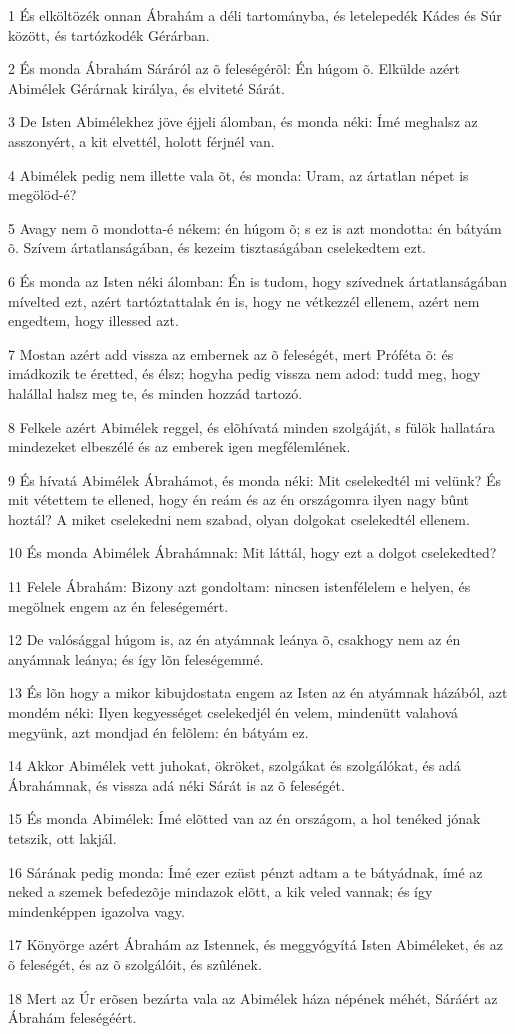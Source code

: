 \par 1 És elköltözék onnan Ábrahám a déli tartományba, és letelepedék Kádes és Súr között, és tartózkodék Gérárban.
\par 2 És monda Ábrahám Sáráról az õ feleségérõl: Én húgom õ. Elkülde azért Abimélek Gérárnak királya, és elviteté Sárát.
\par 3 De Isten Abimélekhez jöve éjjeli álomban, és monda néki: Ímé meghalsz az asszonyért, a kit elvettél, holott férjnél van.
\par 4 Abimélek pedig nem illette vala õt, és monda: Uram, az ártatlan népet is megölöd-é?
\par 5 Avagy nem õ mondotta-é nékem: én húgom õ; s ez is azt mondotta: én bátyám õ. Szívem ártatlanságában, és kezeim tisztaságában cselekedtem ezt.
\par 6 És monda az Isten néki álomban: Én is tudom, hogy szívednek ártatlanságában mívelted ezt, azért tartóztattalak én is, hogy ne vétkezzél ellenem, azért nem engedtem, hogy illessed azt.
\par 7 Mostan azért add vissza az embernek az õ feleségét, mert Próféta õ: és imádkozik te éretted, és élsz; hogyha pedig vissza nem adod: tudd meg, hogy halállal halsz meg te, és minden hozzád tartozó.
\par 8 Felkele azért Abimélek reggel, és elõhívatá minden szolgáját, s fülök hallatára mindezeket elbeszélé és az emberek igen megfélemlének.
\par 9 És hívatá Abimélek Ábrahámot, és monda néki: Mit cselekedtél mi velünk? És mit vétettem te ellened, hogy én reám és az én országomra ilyen nagy bûnt hoztál? A miket cselekedni nem szabad, olyan dolgokat cselekedtél ellenem.
\par 10 És monda Abimélek Ábrahámnak: Mit láttál, hogy ezt a dolgot cselekedted?
\par 11 Felele Ábrahám: Bizony azt gondoltam: nincsen istenfélelem e helyen, és megölnek engem az én feleségemért.
\par 12 De valósággal húgom is, az én atyámnak leánya õ, csakhogy nem az én anyámnak leánya; és így lõn feleségemmé.
\par 13 És lõn hogy a mikor kibujdostata engem az Isten az én atyámnak házából, azt mondém néki: Ilyen kegyességet cselekedjél én velem, mindenütt valahová megyünk, azt mondjad én felõlem: én bátyám ez.
\par 14 Akkor Abimélek vett juhokat, ökröket, szolgákat és szolgálókat, és adá Ábrahámnak, és vissza adá néki Sárát is az õ feleségét.
\par 15 És monda Abimélek: Ímé elõtted van az én országom, a hol tenéked jónak tetszik, ott lakjál.
\par 16 Sárának pedig monda: Ímé ezer ezüst pénzt adtam a te bátyádnak, ímé az neked a szemek befedezõje mindazok elõtt, a kik veled vannak; és így mindenképpen igazolva vagy.
\par 17 Könyörge azért Ábrahám az Istennek, és meggyógyítá Isten Abiméleket, és az õ feleségét, és az õ szolgálóit, és szûlének.
\par 18 Mert az Úr erõsen bezárta vala az Abimélek háza népének méhét, Sáráért az Ábrahám feleségéért.

